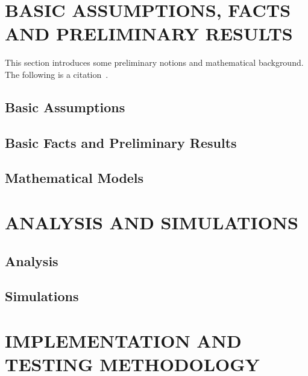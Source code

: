 \documentclass[12pt,reqno,oneside]{pucthesis}         %
\begin{document}

\chapter[BASIC ASSUMPTIONS, FACTS AND PRELIMINARY RESULTS]{BASIC ASSUMPTIONS, FACTS AND PRELIMINARY RESULTS}
This section introduces some preliminary notions and mathematical background.  The following is a citation~\cite{CYB00}.

\section{Basic Assumptions}
\section{Basic Facts and Preliminary Results}
\section{Mathematical Models}



\chapter[ANALYSIS AND SIMULATIONS]{ANALYSIS AND SIMULATIONS}

\section{Analysis}
\section{Simulations}



\chapter[IMPLEMENTATION AND TESTING]{IMPLEMENTATION AND TESTING METHODOLOGY}
\end{document}
